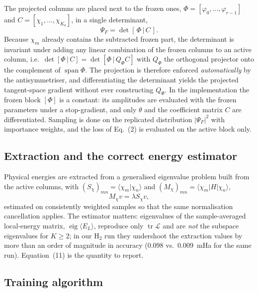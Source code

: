 \documentclass[10pt,a4paper]{article}
\newcommand{\braket}[2]{\langle #1\vert #2\rangle}
\newcommand{\bramat}[3]{\langle #1\vert #2\vert #3\rangle}
\begin{document}
The projected columns are placed next to the frozen ones, $\Phi=[\varphi_0,\dots,\varphi_{r-1}]$ and $C=[\chi_1,\dots,\chi_{K_a}]$, in a single determinant,
\begin{equation}
\Psi_F=\det[\,\Phi\,|\,C\,].
\end{equation}
Because $\chi_m$ already contains the subtracted frozen part, the determinant is invariant under adding any linear combination of the frozen columns to an active column, i.e.\ $\det[\Phi\,|\,C]=\det[\Phi\,|\,Q_\Phi C]$ with $Q_\Phi$ the orthogonal projector onto the complement of $\operatorname{span}\Phi$. The projection is therefore enforced \emph{automatically} by the antisymmetriser, and differentiating the determinant yields the projected tangent-space gradient without ever constructing $Q_\Phi$. In the implementation the frozen block $[\Phi]$ is a constant: its amplitudes are evaluated with the frozen parameters under a stop-gradient, and only $\theta$ and the coefficient matrix $C$ are differentiated. Sampling is done on the replicated distribution $|\Psi_F|^2$ with importance weights, and the loss of Eq.~(2) is evaluated on the active block only.

\subsection{Extraction and the correct energy estimator}

Physical energies are extracted from a generalised eigenvalue problem built from the active columns, with $(S_\chi)_{mn}=\braket{\chi_m}{\chi_n}$ and $(M_\chi)_{mn}=\bramat{\chi_m}{H}{\chi_n}$,
\begin{equation}
M_\chi v=\lambda S_\chi v,
\end{equation}
estimated on consistently weighted samples so that the same normalisation cancellation applies. The estimator matters: eigenvalues of the sample-averaged local-energy matrix, $\operatorname{eig}\langle E_L\rangle$, reproduce only $\operatorname{tr}\mathcal{L}$ and are \emph{not} the subspace eigenvalues for $K\ge2$; in our H$_2$ run they undershoot the extraction values by more than an order of magnitude in accuracy (0.098 vs.\ 0.009~mHa for the same run). Equation~(11) is the quantity to report.

\subsection{Training algorithm}
\end{document}
